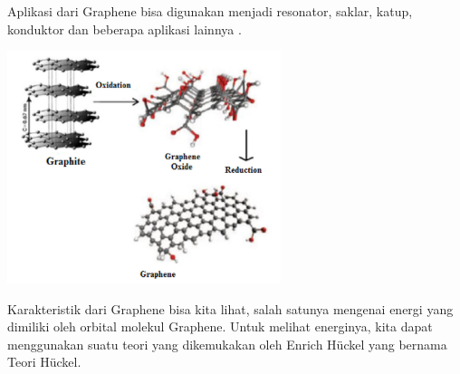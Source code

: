 \documentclass[12pt,a4paper]{report}
\begin{document}
	Aplikasi dari Graphene bisa digunakan menjadi resonator, saklar, katup, konduktor dan beberapa aplikasi lainnya \cite{Clemons2010}.
	
	\begin{center}
		\includegraphics[width=8cm]{gambar/oksgraf.png}
	\end{center}
	
	Karakteristik dari Graphene bisa kita lihat, salah satunya mengenai energi yang dimiliki oleh orbital molekul Graphene. Untuk melihat energinya, kita dapat menggunakan suatu teori yang dikemukakan oleh Enrich Hückel yang bernama Teori Hückel. 
	
\end{document}
